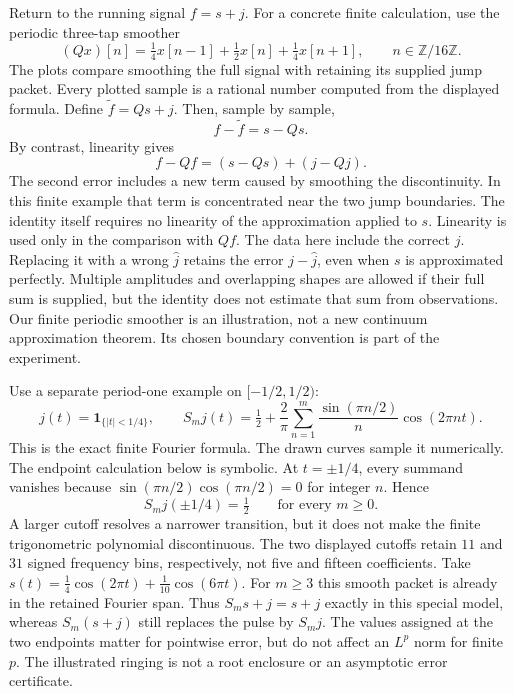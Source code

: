 Return to the running signal $f=s+j$. For a concrete finite calculation, use the periodic three-tap smoother
\[
(Qx)[n]=\tfrac14x[n-1]+\tfrac12x[n]+\tfrac14x[n+1],\qquad n\in\mathbb Z/16\mathbb Z.
\]
The plots compare smoothing the full signal with retaining its supplied jump packet. Every plotted sample is a rational number computed from the displayed formula.
Define $\widetilde f=Qs+j$. Then, sample by sample,
\[
\boxed{f-\widetilde f=s-Qs.}
\]
By contrast, linearity gives
\[
f-Qf=(s-Qs)+(j-Qj).
\]
The second error includes a new term caused by smoothing the discontinuity. In this finite example that term is concentrated near the two jump boundaries. The identity itself requires no linearity of the approximation applied to $s$. Linearity is used only in the comparison with $Qf$.
The data here include the correct $j$. Replacing it with a wrong $\widehat j$ retains the error $j-\widehat j$, even when $s$ is approximated perfectly. Multiple amplitudes and overlapping shapes are allowed if their full sum is supplied, but the identity does not estimate that sum from observations.
Our finite periodic smoother is an illustration, not a new continuum approximation theorem. Its chosen boundary convention is part of the experiment.

Use a separate period-one example on $[-1/2,1/2)$:
\[
j(t)=\mathbf 1_{\{|t|<1/4\}},\qquad
S_mj(t)=\tfrac12+\frac2\pi\sum_{n=1}^{m}\frac{\sin(\pi n/2)}{n}\cos(2\pi nt).
\]
This is the exact finite Fourier formula. The drawn curves sample it numerically. The endpoint calculation below is symbolic.
At $t=\pm1/4$, every summand vanishes because
$\sin(\pi n/2)\cos(\pi n/2)=0$ for integer $n$. Hence
\[
S_mj(\pm1/4)=\tfrac12 \qquad\text{for every }m\ge0.
\]
A larger cutoff resolves a narrower transition, but it does not make the finite trigonometric polynomial discontinuous. The two displayed cutoffs retain $11$ and $31$ signed frequency bins, respectively, not five and fifteen coefficients.
Take $s(t)=\frac14\cos(2\pi t)+\frac1{10}\cos(6\pi t)$. For $m\ge3$ this smooth packet is already in the retained Fourier span. Thus $S_ms+j=s+j$ exactly in this special model, whereas $S_m(s+j)$ still replaces the pulse by $S_mj$.
The values assigned at the two endpoints matter for pointwise error, but do not affect an $L^p$ norm for finite $p$. The illustrated ringing is not a root enclosure or an asymptotic error certificate.

